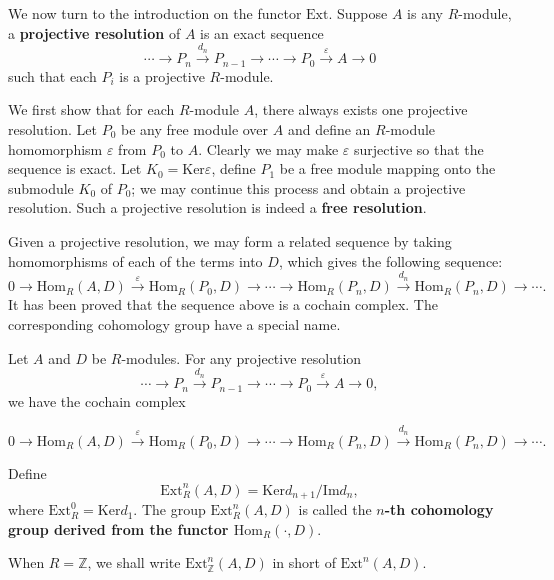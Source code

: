 We now turn to the introduction on the functor $\mathrm{Ext}$. Suppose $A$ is any $R$-module, a \textbf{projective resolution} of $A$ is an exact sequence 
$$
\cdots \longrightarrow P_n\overset{d_n}{\longrightarrow}P_{n-1}\longrightarrow \cdots \longrightarrow P_0\overset{\varepsilon}{\longrightarrow}A\longrightarrow 0
$$
such that each $P_i$ is a projective $R$-module.\par
We first show that for each $R$-module $A$, there always exists one projective resolution. Let $P_0$ be any free module over $A$ and define an $R$-module homomorphism $\varepsilon$ from $P_0$ to $A$. Clearly we may make $\varepsilon$ surjective so that the sequence is exact. Let $K_0=\mathrm{Ker}\varepsilon$, define $P_1$ be a free module mapping onto the submodule $K_0$ of $P_0$; we may continue this process and obtain a projective resolution. Such a projective resolution is indeed a \textbf{free resolution}.\par
Given a projective resolution, we may form a related sequence by taking homomorphisms of each of the terms into $D$, which gives the following sequence: 
$$
0\longrightarrow \mathrm{Hom}_R\left( A,D \right) \overset{\varepsilon}{\longrightarrow}\mathrm{Hom}_R\left( P_0,D \right) \longrightarrow \cdots \longrightarrow \mathrm{Hom}_R\left( P_n,D \right) \overset{d_n}{\longrightarrow}\mathrm{Hom}_R\left( P_n,D \right) \longrightarrow \cdots .
$$
It has been proved that the sequence above is a cochain complex. The corresponding cohomology group have a special name.
\begin{definition}
Let $A$ and $D$ be $R$-modules. For any projective resolution 
$$
\cdots \longrightarrow P_n\overset{d_n}{\longrightarrow}P_{n-1}\longrightarrow \cdots \longrightarrow P_0\overset{\varepsilon}{\longrightarrow}A\longrightarrow 0,
$$
we have the cochain complex 
\begin{small}
$$
0\longrightarrow \mathrm{Hom}_R\left( A,D \right) \overset{\varepsilon}{\longrightarrow}\mathrm{Hom}_R\left( P_0,D \right) \longrightarrow \cdots \longrightarrow \mathrm{Hom}_R\left( P_n,D \right) \overset{d_n}{\longrightarrow}\mathrm{Hom}_R\left( P_n,D \right) \longrightarrow \cdots .
$$
\end{small}
Define 
$$
\mathrm{Ext}_{R}^{n}\left( A,D \right) =\mathrm{Ker}d_{n+1}/\mathrm{Im}d_n,
$$
where $\mathrm{Ext}_R^0=\mathrm{Ker}d_1$. The group $\mathrm{Ext}_R^n(A,D)$ is called the \textbf{$n$-th cohomology group derived from the functor $\mathrm{Hom}_R(\cdot,D)$}.
\end{definition}
When $R=\mathbb{Z}$, we shall write $\mathrm{Ext}_\mathbb{Z}^n(A,D)$ in short of $\mathrm{Ext}^n(A,D)$.
